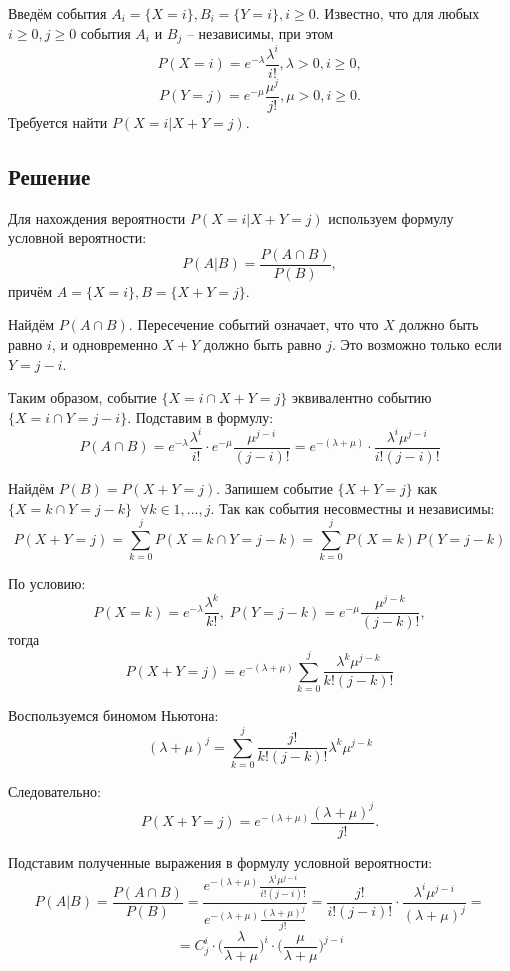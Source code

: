 \documentclass[a4paper,14pt]{extarticle}
\begin{document}
            Введём события \( A_i = \{X = i\}, B_i = \{Y = i\}, i \geq 0 \). Известно, что для любых \( i \geq 0, j \geq 0 \) события \( A_i \) и \( B_j \) -- независимы, при этом
            \[ P(X = i) = e^{-\lambda} \frac{\lambda^i}{i!}, \lambda > 0, i \geq 0, \]
            \[ P(Y = j) = e^{-\mu} \frac{\mu^j}{j!}, \mu > 0, i \geq 0. \]
            Требуется найти \( P(X = i | X + Y = j) \).
        
        \subsection*{Решение}
            
            Для нахождения вероятности \( P(X = i | X + Y = j) \) используем формулу условной вероятности:
            \[ P(A|B) = \frac{P( A \cap B)}{P(B)}, \]
            причём \(A = \{X = i\}, B = \{X + Y = j\}\).
            
            Найдём \(P( A \cap B)\). Пересечение событий означает, что что \(X\) должно быть равно \(i\), и одновременно \(X+Y\) должно быть равно \(j\). Это возможно только если \(Y=j-i\).
            
            Таким образом, событие \(\{X = i \cap X + Y = j\}\) эквивалентно событию \(\{X = i \cap Y = j - i\}\). Подставим в формулу:
            \[P(A \cap B ) =  e^{-\lambda} \frac{\lambda^i}{i!} \cdot e^{-\mu} \frac{\mu^{j-i}}{(j-i)!} = e^{-(\lambda + \mu)} \cdot \frac{\lambda^i \mu^{j-i}}{i!(j-i)!}\]
            
            Найдём \(P(B) = P(X + Y = j) \). Запишем событие \(\{X + Y = j\}\) как \(\{X = k \cap Y = j-k\} \;\; \forall k \in {1, \dots, j}\). Так как события несовместны и независимы:
            \[ P(X + Y = j) = \sum_{k=0}^{j} P(X = k \cap Y = j-k) = \sum_{k=0}^{j}P(X = k) P(Y = j - k)\]
            
            По условию:
            \[P(X = k) = e^{-\lambda} \frac{\lambda^k}{k!}, \; P(Y = j - k) = e^{-\mu} \frac{\mu^{j-k}}{(j-k)!}, \]
            тогда
            \[ P(X + Y = j) = e^{-(\lambda + \mu)} \sum_{k=0}^{j} \frac{\lambda^k \mu^{j-k}}{k!(j-k)!} \]
            
            Воспользуемся биномом Ньютона: \[(\lambda + \mu)^j = \sum_{k=0}^{j} \frac{j!}{k!(j-k)!} \lambda^k \mu^{j-k}\]
            
            Следовательно:
            \[P(X+Y=j) = e^{-(\lambda + \mu)} \frac{(\lambda+\mu)^j}{j!}.\]
            
            Подставим полученные выражения в формулу условной вероятности:
            \[P(A|B) = \frac{P( A \cap B)}{P(B)} = \frac{e^{-(\lambda + \mu)} \frac{\lambda^i \mu^{j-i}}{i!(j-i)!}}{e^{-(\lambda + \mu)} \frac{(\lambda+\mu)^j}{j!}} = \frac{j!}{i!(j-i)!} \cdot \frac{\lambda^i \mu^{j-i}}{(\lambda+\mu)^j} =\]
            \[ = C_j^i \cdot \big(\frac{\lambda}{\lambda+\mu}\big)^i \cdot \big(\frac{\mu}{\lambda+\mu}\big)^{j-i}\]
            
\end{document}
